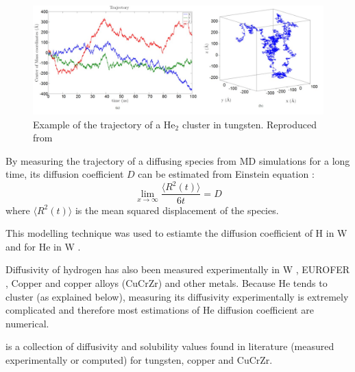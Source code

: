 \begin{figure}
    \centering
    \includegraphics[width=\linewidth]{Figures/Chapter1/faney_md.jpg}
    \caption{Example of the trajectory of a He$_2$ cluster in tungsten. Reproduced from \cite{faney_numerical_2013}}
    \label{fig: md faney}
\end{figure}

By measuring the trajectory of a diffusing species from MD simulations for a long time, its diffusion coefficient $D$ can be estimated from Einstein equation \cite{einstein_uber_1905}:
\begin{equation}
    \lim_{x\to\infty} \frac{\langle R^2(t) \rangle}{6t} = D
\end{equation}
where $\langle R^2(t) \rangle$ is the mean squared displacement of the species.

This modelling technique was used to estiamte the diffusion coefficient of H in W  and for He in W .

Diffusivity of hydrogen has also been measured experimentally in W , EUROFER , Copper and copper alloys (CuCrZr)  and other metals.
Because He tends to cluster (as explained below), measuring its diffusivity experimentally is extremely complicated and therefore most estimations of He diffusion coefficient are numerical.

 is a collection of diffusivity and solubility values found in literature (measured experimentally or computed) for tungsten, copper and CuCrZr.

